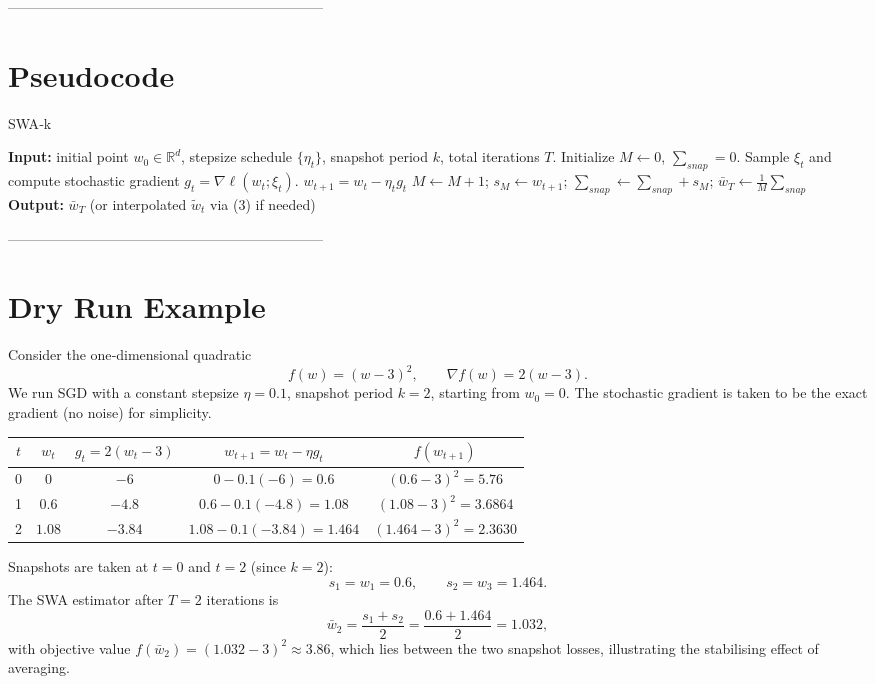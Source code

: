 \documentclass{article}
\newcommand{\R}{\mathbb{R}}
\begin{document}
--------------------------------------------------------------------

\section*{Pseudocode}
\begin{algorithm}[H]
\caption{SWA‑k}
\begin{algorithmic}[1]
\State \textbf{Input:} initial point $w_0\in\R^{d}$, stepsize schedule $\{\eta_t\}$, snapshot period $k$, total iterations $T$.
\State Initialize $M\gets 0$, $\displaystyle\sum_{snap}=0$.
    \State Sample $\xi_t$ and compute stochastic gradient $g_t=\nabla\ell(w_t;\xi_t)$.
    \State $w_{t+1}= w_t - \eta_t g_t$ \hfill {}
        \State $M\gets M+1$;   
        \State $s_M \gets w_{t+1}$;
        \State $\sum_{snap}\gets \sum_{snap}+s_M$;
    \EndIf
\EndFor
\State $\displaystyle \bar w_T \gets \frac{1}{M}\sum_{snap}$ \hfill {}
\State \textbf{Output:} $\bar w_T$ (or interpolated $\tilde w_t$ via (3) if needed)
\end{algorithmic}
\end{algorithm}

--------------------------------------------------------------------

\section*{Dry Run Example}
Consider the one‑dimensional quadratic
\[
f(w)=(w-3)^2,\qquad \nabla f(w)=2(w-3).
\]
We run SGD with a constant stepsize $\eta=0.1$, snapshot period $k=2$,
starting from $w_0=0$.  The stochastic gradient is taken to be the exact
gradient (no noise) for simplicity.

\begin{center}
\begin{tabular}{c|c|c|c|c}
$t$ & $w_t$ & $g_t=2(w_t-3)$ & $w_{t+1}=w_t-\eta g_t$ & $f(w_{t+1})$\\\hline
0 & $0$ & $-6$ & $0-0.1(-6)=0.6$ & $(0.6-3)^2=5.76$\\
1 & $0.6$ & $-4.8$ & $0.6-0.1(-4.8)=1.08$ & $(1.08-3)^2=3.6864$\\
2 & $1.08$ & $-3.84$ & $1.08-0.1(-3.84)=1.464$ & $(1.464-3)^2=2.3630$\\
\end{tabular}
\end{center}
Snapshots are taken at $t=0$ and $t=2$ (since $k=2$):
\[
s_1=w_{1}=0.6,\qquad s_2=w_{3}=1.464.
\]
The SWA estimator after $T=2$ iterations is
\[
\bar w_2=\frac{s_1+s_2}{2}= \frac{0.6+1.464}{2}=1.032,
\]
with objective value $f(\bar w_2)=(1.032-3)^2\approx3.86$, which lies between
the two snapshot losses, illustrating the stabilising effect of averaging.
\end{document}
